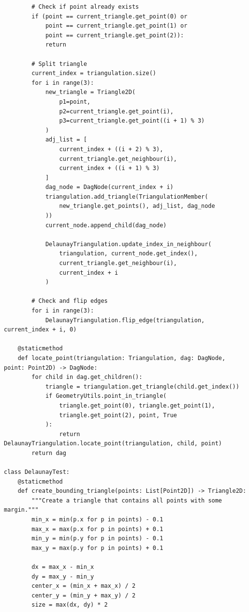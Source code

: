 \documentclass{article}
\begin{document}
\begin{lstlisting}
        # Check if point already exists
        if (point == current_triangle.get_point(0) or 
            point == current_triangle.get_point(1) or 
            point == current_triangle.get_point(2)):
            return
            
        # Split triangle
        current_index = triangulation.size()
        for i in range(3):
            new_triangle = Triangle2D(
                p1=point,
                p2=current_triangle.get_point(i),
                p3=current_triangle.get_point((i + 1) % 3)
            )
            adj_list = [
                current_index + ((i + 2) % 3),
                current_triangle.get_neighbour(i),
                current_index + ((i + 1) % 3)
            ]
            dag_node = DagNode(current_index + i)
            triangulation.add_triangle(TriangulationMember(
                new_triangle.get_points(), adj_list, dag_node
            ))
            current_node.append_child(dag_node)
            
            DelaunayTriangulation.update_index_in_neighbour(
                triangulation, current_node.get_index(),
                current_triangle.get_neighbour(i),
                current_index + i
            )
        
        # Check and flip edges
        for i in range(3):
            DelaunayTriangulation.flip_edge(triangulation, current_index + i, 0)

    @staticmethod
    def locate_point(triangulation: Triangulation, dag: DagNode, point: Point2D) -> DagNode:
        for child in dag.get_children():
            triangle = triangulation.get_triangle(child.get_index())
            if GeometryUtils.point_in_triangle(
                triangle.get_point(0), triangle.get_point(1),
                triangle.get_point(2), point, True
            ):
                return DelaunayTriangulation.locate_point(triangulation, child, point)
        return dag

class DelaunayTest:
    @staticmethod
    def create_bounding_triangle(points: List[Point2D]) -> Triangle2D:
        """Create a triangle that contains all points with some margin."""
        min_x = min(p.x for p in points) - 0.1
        max_x = max(p.x for p in points) + 0.1
        min_y = min(p.y for p in points) - 0.1
        max_y = max(p.y for p in points) + 0.1
        
        dx = max_x - min_x
        dy = max_y - min_y
        center_x = (min_x + max_x) / 2
        center_y = (min_y + max_y) / 2
        size = max(dx, dy) * 2
        

\end{lstlisting}
\end{document}
